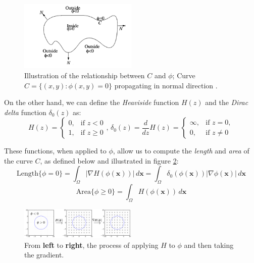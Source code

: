 \documentclass[journal]{IEEEtran}
\begin{document}
\begin{figure}[!t]
    \centering
    \includegraphics[width=0.5\textwidth]{images/phi.png}
    \caption{Illustration of the relationship between $C$ and $\phi$; Curve $C = \{ (x, y) : \phi(x, y) = 0 \}$ propagating in normal direction \cite{ChanVese}.}
    \label{fig:phi}
\end{figure}

On the other hand, we can define the \emph{Heaviside} function $H(z)$ and the \emph{Dirac delta} function $\delta_0(z)$ as:
\[
    H(z) = \begin{cases}
        0, & \text{if } z < 0    \\
        1, & \text{if } z \geq 0
    \end{cases}, \,
    \delta_0(z) = \frac{d}{dz} H(z) = \begin{cases}
        \infty, & \text{if } z = 0,   \\
        0,      & \text{if } z \neq 0
    \end{cases}
\]

These functions, when applied to $\phi$, allow us to compute the \emph{length} and \emph{area} of the curve $C$, as defined below and illustrated in figure \ref{fig:heaviside-phi-illustration}:
\small
\begin{equation}\label{eq:length-area}
    \textrm{Length}\{\phi = 0\} = \int_{\Omega} |\nabla H(\phi(\bm{x}))| \, d\bm{x} = \int_{\Omega} \delta_0(\phi(\bm{x})) |\nabla \phi(\bm{x})| \, d\bm{x}
\end{equation}
\begin{equation}\label{eq:area}
    \textrm{Area}\{\phi \geq 0\} = \int_{\Omega} H(\phi(\bm{x})) \, d\bm{x}
\end{equation}
\normalsize

\begin{figure}[!t]
    \centering
    \includegraphics[width=0.5\textwidth,keepaspectratio]{images/heaviside-and-phi-illustration.png}
    \caption{From \textbf{left} to \textbf{right}, the process of applying $H$ to $\phi$ and then taking the gradient.}
    \label{fig:heaviside-phi-illustration}
\end{figure}
\end{document}
